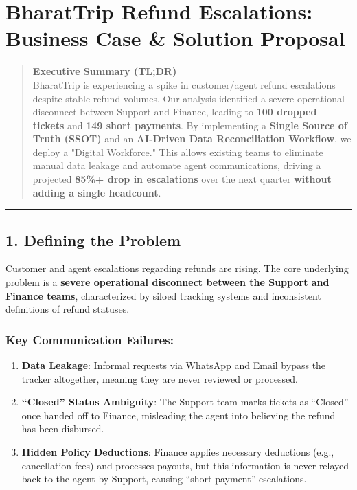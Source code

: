 \documentclass[
]{article}
\author{}
\date{}
\providecommand{\tightlist}{%
  \setlength{\itemsep}{0pt}\setlength{\parskip}{0pt}}
\begin{document}
\section{BharatTrip Refund Escalations: Business Case \& Solution Proposal}\label{bharattrip-refund-escalations-business-case-solution-proposal}

\begin{quote}
\textbf{Executive Summary (TL;DR)}\\
BharatTrip is experiencing a spike in customer/agent refund escalations despite stable refund volumes. Our analysis identified a severe operational disconnect between Support and Finance, leading to \textbf{100 dropped tickets} and \textbf{149 short payments}. By implementing a \textbf{Single Source of Truth (SSOT)} and an \textbf{AI-Driven Data Reconciliation Workflow}, we deploy a "Digital Workforce." This allows existing teams to eliminate manual data leakage and automate agent communications, driving a projected \textbf{85\%+ drop in escalations} over the next quarter \textbf{without adding a single headcount}.
\end{quote}

\begin{center}\rule{0.5\linewidth}{0.5pt}\end{center}

\subsection{1. Defining the Problem}\label{defining-the-problem}

Customer and agent escalations regarding refunds are rising. The core underlying problem is a \textbf{severe operational disconnect between the Support and Finance teams}, characterized by siloed tracking systems and inconsistent definitions of refund statuses.

\subsubsection{Key Communication Failures:}\label{key-communication-failures}

\begin{enumerate}
\def\labelenumi{\arabic{enumi}.}
\tightlist
\item
  \textbf{Data Leakage}: Informal requests via WhatsApp and Email bypass the tracker altogether, meaning they are never reviewed or processed.
\item
  \textbf{``Closed'' Status Ambiguity}: The Support team marks tickets as ``Closed'' once handed off to Finance, misleading the agent into believing the refund has been disbursed.
\item
  \textbf{Hidden Policy Deductions}: Finance applies necessary deductions (e.g., cancellation fees) and processes payouts, but this information is never relayed back to the agent by Support, causing ``short payment'' escalations.
\end{enumerate}
\end{document}
